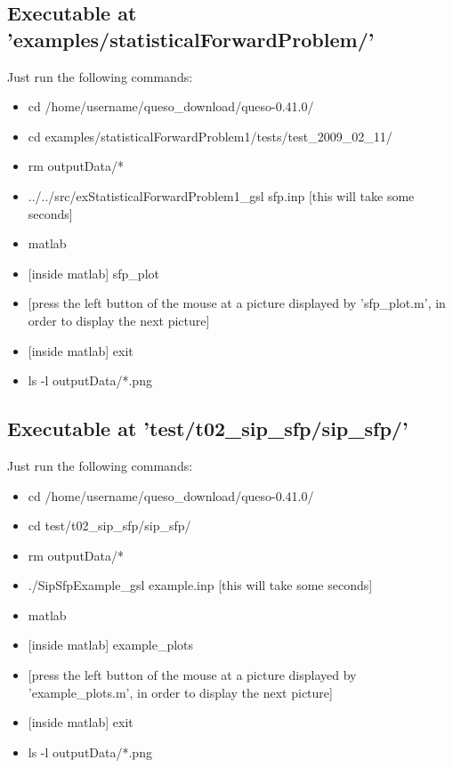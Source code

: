 \subsection{Executable at 'examples/statisticalForwardProblem/'}

Just run the following commands:
\begin{itemize}
\item cd /home/username/queso\_download/queso-0.41.0/
\item cd examples/statisticalForwardProblem1/tests/test\_2009\_02\_11/
\item rm outputData/*
\item ../../src/exStatisticalForwardProblem1\_gsl sfp.inp [this will take some seconds]
\item matlab
\item {[inside matlab] sfp\_plot}
\item {[press the left button of the mouse at a picture displayed by 'sfp\_plot.m', in order to display the next picture]}
\item {[inside matlab]} exit
\item ls -l outputData/*.png
\end{itemize}



\subsection{Executable at 'test/t02\_sip\_sfp/sip\_sfp/'}\label{subsc-t02}

Just run the following commands:
\begin{itemize}
\item cd /home/username/queso\_download/queso-0.41.0/
\item cd test/t02\_sip\_sfp/sip\_sfp/
\item rm outputData/*
\item ./SipSfpExample\_gsl example.inp [this will take some seconds]
\item matlab
\item {[inside matlab]} example\_plots
\item {[press the left button of the mouse at a picture displayed by 'example\_plots.m', in order to display the next picture]}
\item {[inside matlab]} exit
\item ls -l outputData/*.png
\end{itemize}


